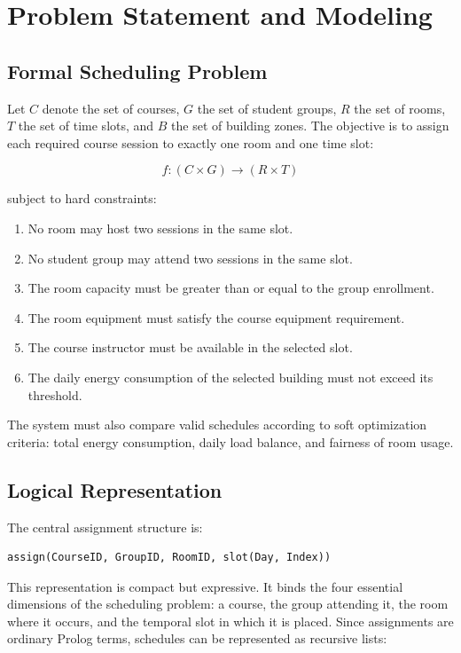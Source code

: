 \documentclass[12pt,a4paper]{article}
\begin{document}
\section{Problem Statement and Modeling}

\subsection{Formal Scheduling Problem}

Let \(C\) denote the set of courses, \(G\) the set of student groups, \(R\) the set of rooms, \(T\) the set of time slots, and \(B\) the set of building zones. The objective is to assign each required course session to exactly one room and one time slot:

\[
    f : (C \times G) \rightarrow (R \times T)
\]

subject to hard constraints:

\begin{enumerate}
    \item No room may host two sessions in the same slot.
    \item No student group may attend two sessions in the same slot.
    \item The room capacity must be greater than or equal to the group enrollment.
    \item The room equipment must satisfy the course equipment requirement.
    \item The course instructor must be available in the selected slot.
    \item The daily energy consumption of the selected building must not exceed its threshold.
\end{enumerate}

The system must also compare valid schedules according to soft optimization criteria: total energy consumption, daily load balance, and fairness of room usage.

\subsection{Logical Representation}

The central assignment structure is:

\begin{lstlisting}[caption={Assignment term used throughout the scheduler}]
assign(CourseID, GroupID, RoomID, slot(Day, Index))
\end{lstlisting}

This representation is compact but expressive. It binds the four essential dimensions of the scheduling problem: a course, the group attending it, the room where it occurs, and the temporal slot in which it is placed. Since assignments are ordinary Prolog terms, schedules can be represented as recursive lists:
\end{document}
